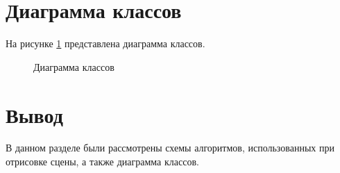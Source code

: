 \clearpage

\section{Диаграмма классов}

На рисунке \ref{fig:diag_class} представлена диаграмма классов.

\begin{figure}[ph!]
	\caption{Диаграмма классов}
	\label{fig:diag_class}
\end{figure}

\clearpage

\section*{Вывод}
В данном разделе были рассмотрены схемы алгоритмов, использованных при отрисовке сцены, а также диаграмма классов.


